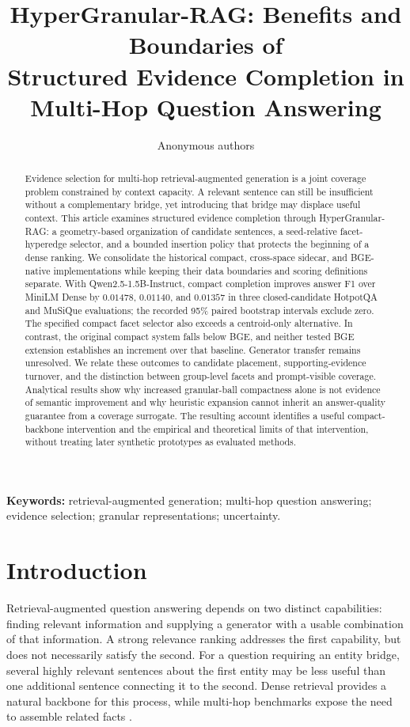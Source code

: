 \documentclass[11pt,a4paper]{article}
\title{HyperGranular-RAG: Benefits and Boundaries of\\
Structured Evidence Completion in Multi-Hop Question Answering}
\author{Anonymous authors}
\date{}
\newcommand{\hgrag}{HyperGranular-RAG\xspace}
\begin{document}
\maketitle
\begin{abstract}
Evidence selection for multi-hop retrieval-augmented generation is a joint
coverage problem constrained by context capacity. A relevant sentence can
still be insufficient without a complementary bridge, yet introducing that
bridge may displace useful context. This article examines structured evidence
completion through \hgrag: a geometry-based organization of candidate
sentences, a seed-relative facet-hyperedge selector, and a bounded insertion
policy that protects the beginning of a dense ranking.
We consolidate the historical compact, cross-space sidecar, and BGE-native
implementations while keeping their data boundaries and scoring definitions
separate. With Qwen2.5-1.5B-Instruct, compact completion improves answer F1
over MiniLM Dense by $0.01478$, $0.01140$, and $0.01357$ in three
closed-candidate HotpotQA and MuSiQue evaluations; the recorded 95\%
paired bootstrap intervals exclude zero. The specified compact facet
selector also exceeds a centroid-only alternative. In contrast, the original
compact system falls below BGE, and neither tested BGE extension establishes
an increment over that baseline. Generator transfer remains unresolved.
We relate these outcomes to candidate placement, supporting-evidence
turnover, and the distinction between group-level facets and prompt-visible
coverage. Analytical results show why increased granular-ball compactness
alone is not evidence of semantic improvement and why heuristic expansion
cannot inherit an answer-quality guarantee from a coverage surrogate.
The resulting account identifies a useful compact-backbone intervention and
the empirical and theoretical limits of that intervention, without treating
later synthetic prototypes as evaluated methods.
\end{abstract}
\noindent\textbf{Keywords:} retrieval-augmented generation; multi-hop question
answering; evidence selection; granular representations; uncertainty.

\section{Introduction}
Retrieval-augmented question answering depends on two distinct capabilities:
finding relevant information and supplying a generator with a usable
combination of that information. A strong relevance ranking addresses the
first capability, but does not necessarily satisfy the second. For a question
requiring an entity bridge, several highly relevant sentences about the first
entity may be less useful than one additional sentence connecting it to the
second. Dense retrieval \citep{karpukhin2020dpr} provides a natural backbone
for this process, while multi-hop benchmarks expose the need to assemble
related facts \citep{yang2018hotpotqa,trivedi2022musique}.
\end{document}
